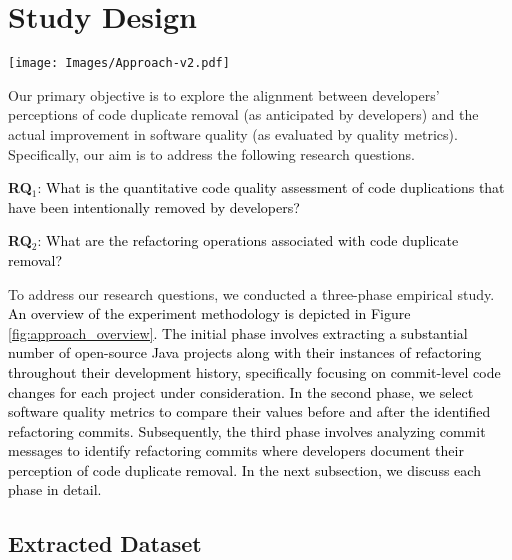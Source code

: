 \section{Study Design}
\label{Section:methodology}


\begin{figure*}[t]
\centering 
\texttt{[image: Images/Approach-v2.pdf]}
\caption{\textcolor{black}{Overview of the empirical study design, highlighting the 3 main phases: Dataset Extraction, Selection of Quality Attributes and Software Metrics, and Data Analysis.}}
\label{fig:approach_overview}
\end{figure*}

Our primary objective is to explore the alignment between developers' perceptions of code duplicate removal (as anticipated by developers) and the actual improvement in software quality (as evaluated by quality metrics). Specifically, our aim is to address the following research questions.
\begin{boxK}
\textbf{RQ$_1$}: \textcolor{black}{What is the quantitative code quality assessment of code duplications that have been intentionally removed by developers?}

\textbf{RQ$_2$}: \textcolor{black}{What are the refactoring operations associated with code duplicate removal?}
\end{boxK}

To address our research questions, we conducted a three-phase empirical study. \textcolor{black}{An overview of the experiment methodology is depicted in Figure \ref{fig:approach_overview}. The initial phase involves extracting a substantial number of open-source Java projects along with their instances of refactoring throughout their development history, specifically focusing on commit-level code changes for each project under consideration. In the second phase, we select software quality metrics to compare their values before and after the identified refactoring commits. Subsequently, the third phase involves analyzing commit messages to identify refactoring commits where developers document their perception of code duplicate removal. In the next subsection, we discuss each phase in detail.}

\subsection{Extracted Dataset}

